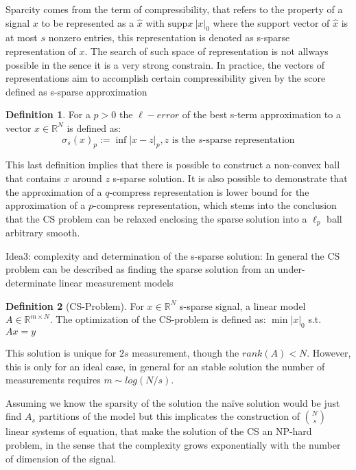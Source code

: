 \documentclass[12pt]{article}
\theoremstyle{definition}
\newtheorem{definition}{Definition}[section]
\begin{document}
Sparcity comes from the term of compressibility, that refers to the property of a signal $x$ to be represented as a $\hat{x}$ with $\text{supp}{x}~|x|_0$ where the support vector of $\hat{x}$ is at most $s$ nonzero entries, this representation is denoted as s-sparse representation of $x$. The search of such space of representation is not allways possible in the sence it is a very strong constrain. In practice, the vectors of representations aim to accomplish certain compressibility given by the score \cite{foucart2013mathematical} defined as s-sparse approximation
\begin{definition}
For a $p>0$ the $\ell-error$ of the best s-term approximation to a vector $x\in\mathbb{R}^N$ is defined as:
\begin{equation}
    \sigma_s(x)_p := \inf{|x-z|_p, z \text{ is the $s$-sparse representation}}
\end{equation}
\end{definition}
This last definition implies that there is possible to construct a non-convex ball that contains $x$ around $z$ s-sparse solution. It is also possible to demonstrate that the approximation of a $q$-compress representation is lower bound for the approximation of a $p$-compress representation, which stems into the conclusion that the CS problem can be relaxed enclosing the sparse solution into a $\ell_p$ ball arbitrary smooth.\par
Idea3: complexity and determination of the s-sparse solution:
In general the CS problem can be described as finding the sparse solution from an under-determinate linear measurement models
\begin{definition} [CS-Problem]
For $x\in\mathbb{R}^N$ s-sparse signal, a linear model $A\in\mathbb{R}^{m\times N}$. The optimization of the CS-problem is defined as: $\min{|x|_0}$ s.t. $Ax=y$ 
\end{definition}
This solution is unique for $2s$ measurement, though the $rank(A)<N$. However, this is only for an ideal case, in general for an stable solution the number of measurements requires $m \sim log(N/s)$.\par
Assuming we know the sparsity of the solution the na\"ive solution would be just find $A_{s}$ partitions of the model but this implicates the construction of $\binom{N}{s}$ linear systems of equation, that make the solution of the CS an NP-hard problem, in the sense that the complexity grows exponentially with the number of dimension of the signal.
\end{document}
